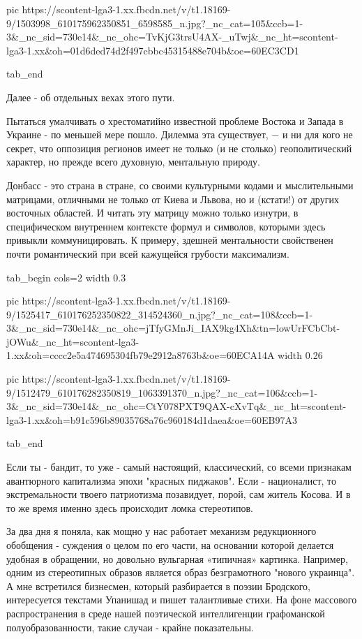      pic https://scontent-lga3-1.xx.fbcdn.net/v/t1.18169-9/1503998_610175962350851_6598585_n.jpg?_nc_cat=105&ccb=1-3&_nc_sid=730e14&_nc_ohc=TvKjG3trsU4AX-_uTwj&_nc_ht=scontent-lga3-1.xx&oh=01d6ded74d2f497cbbc45315488e704b&oe=60EC3CD1

  tab_end
\fi

Далее - об отдельных вехах этого пути.

Пытаться умалчивать о хрестоматийно известной проблеме Востока и Запада в
Украине - по меньшей мере пошло. Дилемма эта существует, − и ни для кого не
секрет, что оппозиция регионов имеет не только (и не столько) геополитический
характер, но прежде всего духовную, ментальную природу. 

Донбасс - это страна в стране, со своими культурными кодами и мыслительными
матрицами, отличными не только от Киева и Львова, но и (кстати!) от других
восточных областей. И читать эту матрицу можно только изнутри, в специфическом
внутреннем контексте формул и символов, которыми здесь привыкли
коммуницировать. К примеру, здешней ментальности свойственен почти
романтический при всей кажущейся грубости максимализм. 

\ifcmt
  tab_begin cols=2
		width 0.3

     pic https://scontent-lga3-1.xx.fbcdn.net/v/t1.18169-9/1525417_610176252350822_314524360_n.jpg?_nc_cat=108&ccb=1-3&_nc_sid=730e14&_nc_ohc=jTfyGMnJi_IAX9kg4Xh&tn=lowUrFCbCbt-jOWu&_nc_ht=scontent-lga3-1.xx&oh=cccc2e5a474695304fb79e2912a8763b&oe=60ECA14A
		width 0.26

     pic https://scontent-lga3-1.xx.fbcdn.net/v/t1.18169-9/1512479_610176282350819_1063391370_n.jpg?_nc_cat=106&ccb=1-3&_nc_sid=730e14&_nc_ohc=CtY078PXT9QAX-cXvTq&_nc_ht=scontent-lga3-1.xx&oh=b91c596b89035768a76c960184d1daea&oe=60EB97A3

  tab_end
\fi

Если ты - бандит, то уже - самый настоящий, классический, со всеми
признакам авантюрного капитализма эпохи "красных пиджаков". Если - националист,
то экстремальности твоего патриотизма позавидует, порой, сам житель Косова. И в
то же время именно здесь происходит ломка стереотипов. 

За два дня я поняла, как мощно у нас работает механизм редукционного обобщения
- суждения о целом по его части, на основании которой делается удобная в
обращении, но довольно вульгарная «типичная» картинка. Например, одним из
стереотипных  образов является образ безграмотного "нового украинца". А мне
встретился бизнесмен, который разбирается в поэзии Бродского, интересуется
текстами Упанишад и пишет талантливые стихи. На фоне массового распространения
в среде нашей поэтической интеллигенции графоманской полуобразованности, такие
случаи - крайне показательны. 

